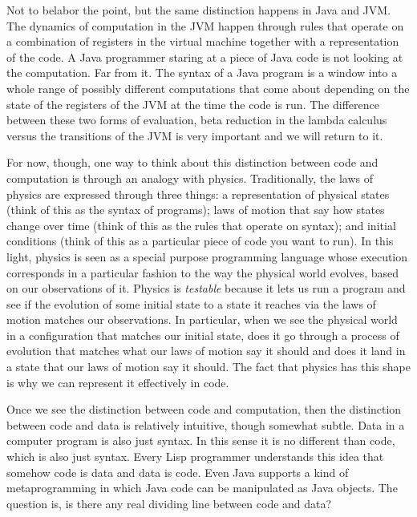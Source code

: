 \documentclass[runningheads]{llncs}
\begin{document}
\vspace{1\baselineskip}
Not to belabor the point, but the same distinction happens in Java and JVM. The dynamics of computation in the JVM happen through rules that operate on a combination of registers in the virtual machine together with a representation of the code. A Java programmer staring at a piece of Java code is not looking at the computation. Far from it. The syntax of a Java program is a window into a whole range of possibly different computations that come about depending on the state of the registers of the JVM at the time the code is run. The difference between these two forms of evaluation, beta reduction in the lambda calculus versus the transitions of the JVM is very important and we will return to it.

\vspace{1\baselineskip}
For now, though, one way to think about this distinction between code and computation is through an analogy with physics. Traditionally, the laws of physics are expressed through three things: a representation of physical states (think of this as the syntax of programs); laws of motion that say how states change over time (think of this as the rules that operate on syntax); and initial conditions (think of this as a particular piece of code you want to run). In this light, physics is seen as a special purpose programming language whose execution corresponds in a particular fashion to the way the physical world evolves, based on our observations of it. Physics is \textit{testable} because it lets us run a program and see if the evolution of some initial state to a state it reaches via the laws of motion matches our observations. In particular, when we see the physical world in a configuration that matches our initial state, does it go through a process of evolution that matches what our laws of motion say it should and does it land in a state that our laws of motion say it should. The fact that physics has this shape is why we can represent it effectively in code.

\vspace{1\baselineskip}
Once we see the distinction between code and computation, then the distinction between code and data is relatively intuitive, though somewhat subtle. Data in a computer program is also just syntax. In this sense it is no different than code, which is also just syntax. Every Lisp programmer understands this idea that somehow code is data and data is code. Even Java supports a kind of metaprogramming in which Java code can be manipulated as Java objects. The question is, is there any real dividing line between code and data? 
\end{document}
